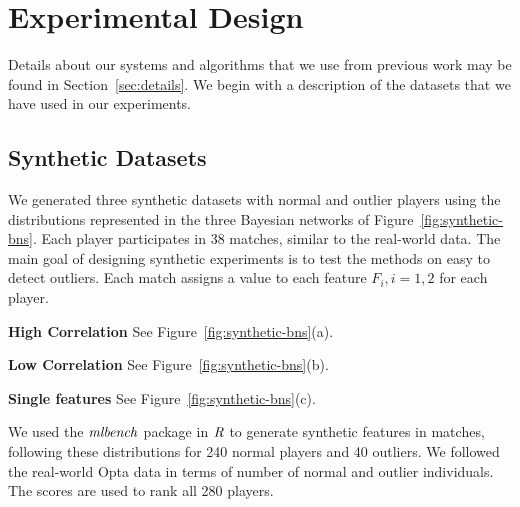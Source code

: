 \documentclass[conference]{IEEEtran}
\begin{document}
				\section{Experimental Design}
Details about our systems and algorithms that we use from previous work may be found in Section~\ref{sec:details}.  
We begin with a description of the datasets that we have used in our experiments.
				
				\subsection{Synthetic Datasets}
				
				We generated three synthetic datasets with normal and outlier players using the distributions represented in the three Bayesian networks of Figure~\ref{fig:synthetic-bns}. 
				Each player participates in 38 matches, similar to the real-world data. The main goal of designing synthetic experiments is to test the methods on  easy to detect outliers. Each match assigns a value to each feature $F_i, i =  1,2$ for each player. 
				\begin{LaTeXdescription}
				\item\textbf{High Correlation} See Figure~\ref{fig:synthetic-bns}(a).
				\item\textbf{Low Correlation} See Figure~\ref{fig:synthetic-bns}(b).
				\item\textbf{Single features} See Figure~\ref{fig:synthetic-bns}(c).
				\end{LaTeXdescription}
			
				
				
				
				
				
				We used the $\it{mlbench}$ package in $\it{R}$ to generate synthetic features in matches, following these distributions for 240 normal players and 40 outliers. We followed the real-world Opta data in terms of number of normal and outlier individuals. The scores are used to rank all 280 players. 
\end{document}

